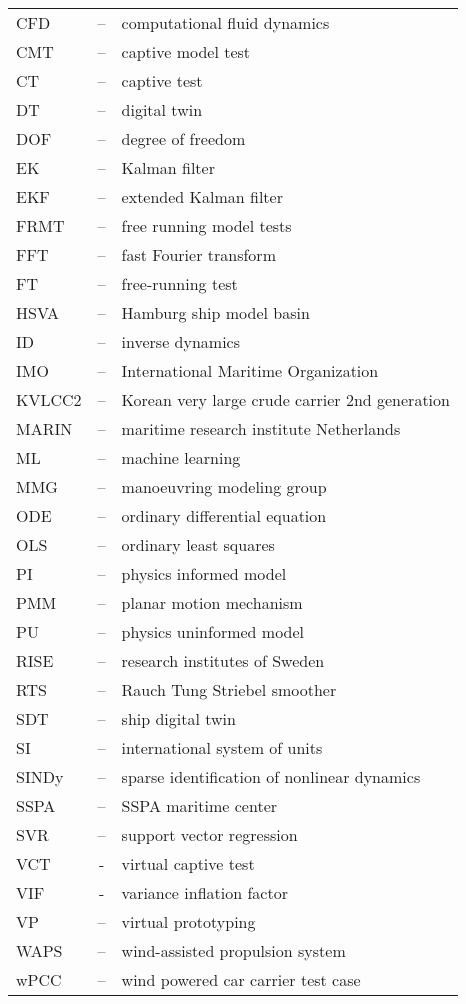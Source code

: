
\begin{tabular}{ l c l }
CFD & -- & computational fluid dynamics\\
CMT & -- & captive model test \\
CT & -- & captive test \\
DT  & -- & digital twin\\
DOF & -- & degree of freedom\\
EK & -- & Kalman filter \\
EKF & -- & extended Kalman filter \\
FRMT & -- & free running model tests \\
FFT & -- & fast Fourier transform\\
FT & -- & free-running test\\
HSVA & -- & Hamburg ship model basin \\
ID & -- & inverse dynamics \\
IMO & -- & International Maritime Organization \\
KVLCC2 & -- & Korean very large crude carrier 2nd generation \\
MARIN & -- & maritime research institute Netherlands \\
ML & -- & machine learning \\
MMG & -- & manoeuvring modeling group \\
ODE & -- & ordinary differential equation\\
OLS & -- & ordinary least squares\\
PI & -- & physics informed model \\ 
PMM & -- & planar motion mechanism \\ 
PU & -- & physics uninformed model \\
RISE & -- & research institutes of Sweden \\
RTS & -- & Rauch Tung Striebel smoother \\
SDT  & -- & ship digital twin\\
SI  & -- & international system of units\\
SINDy  & -- & sparse identification of nonlinear dynamics \\
SSPA & -- & SSPA maritime center \\
SVR & -- & support vector regression \\
VCT & - & virtual captive test \\
VIF & - & variance inflation factor \\
VP & -- & virtual prototyping \\
WAPS & -- & wind-assisted propulsion system\\
wPCC & -- & wind powered car carrier test case\\
\end{tabular}
